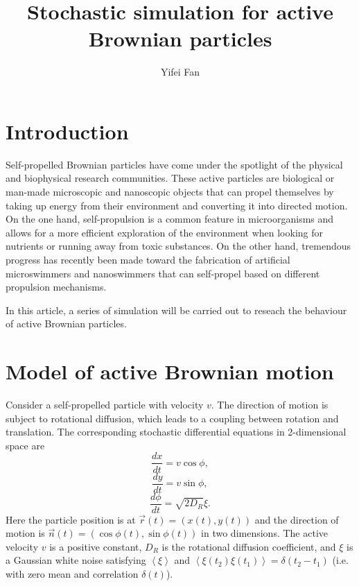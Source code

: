 \documentclass[runningheads]{llncs}
\begin{document}
%
\title{Stochastic simulation for active Brownian particles}
%
%
\author{Yifei Fan}
%
%
%
\maketitle              %

\section{Introduction}
Self-propelled  Brownian  particles  have  come  under  the  spotlight  of  the  physical  and  biophysical 
research communities. These active particles are biological or man-made microscopic and nanoscopic 
objects that can propel themselves by taking up energy from their environment and converting it into 
directed motion. On the one hand, self-propulsion is a common feature in microorganisms and allows 
for a more efficient exploration of the environment when looking for nutrients or running away from 
toxic substances. On the other hand, tremendous progress has recently been made toward the fabrication 
of  artificial  microswimmers  and  nanoswimmers  that  can  self-propel  based  on  different  propulsion 
mechanisms\cite{ref:ap}. 

In this article, a series of simulation will be carried out to reseach the behaviour of active Brownian particles.

\section{Model of active Brownian motion}
Consider  a  self-propelled  particle  with  velocity $v$.  The  direction  of  motion  is  subject  to  rotational
diffusion,  which  leads  to  a  coupling  between  rotation  and  translation.  The  corresponding  stochastic
differential equations in 2-dimensional space are
\begin{equation}
    \label{eq:xode}
    \frac{dx}{dt}=v\cos{\phi},
\end{equation}
\begin{equation}
    \label{eq:yode}
    \frac{dy}{dt}=v\sin{\phi},
\end{equation}
\begin{equation}
    \label{eq:phiode}
    \frac{d\phi}{dt}=\sqrt{2D_R}\xi.
\end{equation}
Here the particle position is at $\vec{r}(t)=\left(x(t),y(t)\right)$
and the direction of motion is $\vec{n}(t)=\left(\cos{\phi(t)},\sin{\phi(t)}\right)$
in two dimensions. The active velocity $v$ is a positive constant, $D_R$ is the
rotational diffusion coefficient, and $\xi$ is a Gaussian white noise satisfying $\left\langle\xi\right\rangle$
and $\left\langle\xi(t_2)\xi(t_1)\right\rangle=\delta(t_2-t_1)$
(i.e. with zero mean and correlation $\delta(t)$).
\end{document}
